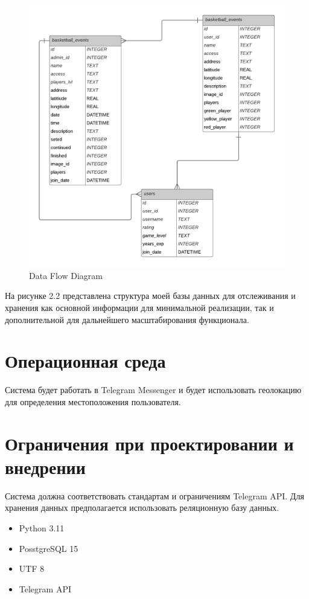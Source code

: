 \documentclass{scrreprt}
\begin{document}
\begin{figure}[h!]
    \centering
    \includegraphics[width=15cm]{Пустой диаграммой.png}
    \caption{Data Flow Diagram}
    \label{fig:Data Flow Diagram}
\end{figure}
\newline
На рисунке 2.2 представлена структура моей базы данных для отслеживания и хранения как основной информации для минимальной реализации, так и дополнительной для дальнейшего масштабирования функционала.


\section{Операционная среда}
Система будет работать в Telegram Messenger и будет использовать геолокацию для определения местоположения пользователя.

\section{Ограничения при проектировании и внедрении}
Система должна соответствовать стандартам и ограничениям Telegram API. Для хранения данных предполагается использовать реляционную базу данных.
\begin{itemize}
    \item Python 3.11
    \item PosstgreSQL 15
    \item UTF 8
    \item Telegram API
\end{itemize}
\end{document}
